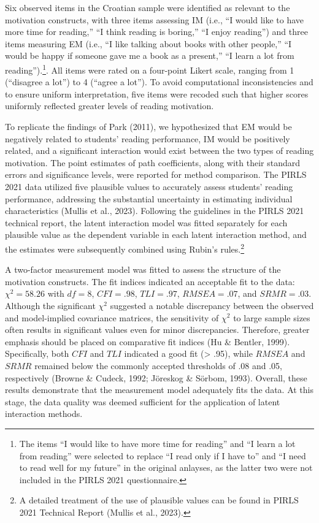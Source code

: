 \documentclass[
  man]{apa6}
\begin{document}
Six observed items in the Croatian sample were identified as relevant to the motivation constructs, with three items assessing IM (i.e., ``I would like to have more time for reading,'' ``I think reading is boring,'' ``I enjoy reading'') and three items measuring EM (i.e., ``I like talking about books with other people,'' ``I would be happy if someone gave me a book as a present,'' ``I learn a lot from reading'').\footnote{The items ``I would like to have more time for reading'' and ``I learn a lot from reading'' were selected to replace ``I read only if I have to'' and ``I need to read well for my future'' in the original anlayses, as the latter two were not included in the PIRLS 2021 questionnaire.}. All items were rated on a four-point Likert scale, ranging from 1 (``disagree a lot'') to 4 (``agree a lot''). To avoid computational inconsistencies and to ensure uniform interpretation, five items were recoded such that higher scores uniformly reflected greater levels of reading motivation.

To replicate the findings of Park (2011), we hypothesized that EM would be negatively related to students' reading performance, IM would be positively related, and a significant interaction would exist between the two types of reading motivation. The point estimates of path coefficients, along with their standard errors and significance levels, were reported for method comparison. The PIRLS 2021 data utilized five plausible values to accurately assess students' reading performance, addressing the substantial uncertainty in estimating individual characteristics (Mullis et al., 2023). Following the guidelines in the PIRLS 2021 technical report, the latent interaction model was fitted separately for each plausible value as the dependent variable in each latent interaction method, and the estimates were subsequently combined using Rubin's rules.\footnote{A detailed treatment of the use of plausible values can be found in PIRLS 2021 Technical Report (Mullis et al., 2023).}

A two-factor measurement model was fitted to assess the structure of the motivation constructs. The fit indices indicated an acceptable fit to the data: \(\chi^2 = 58.26\) with \(\textit{df} = 8\), \(CFI = .98\), \(TLI = .97\), \(RMSEA = .07\), and \(SRMR = .03\). Although the significant \(\chi^2\) suggested a notable discrepancy between the observed and model-implied covariance matrices, the sensitivity of \(\chi^2\) to large sample sizes often results in significant values even for minor discrepancies. Therefore, greater emphasis should be placed on comparative fit indices (Hu \& Bentler, 1999). Specifically, both \(CFI\) and \(TLI\) indicated a good fit (\textgreater{} .95), while \(RMSEA\) and \(SRMR\) remained below the commonly accepted thresholds of .08 and .05, respectively (Browne \& Cudeck, 1992; Jöreskog \& Sörbom, 1993). Overall, these results demonstrate that the measurement model adequately fits the data. At this stage, the data quality was deemed sufficient for the application of latent interaction methods.
\end{document}
